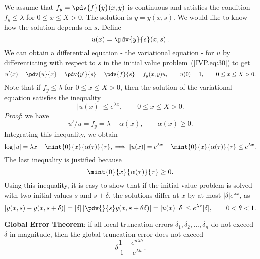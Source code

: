 We assume that $f_y=\pdv{f}{y}(x,y)$ is continuous
and satisfies the condition $f_y\le \lambda$ for $0\le x\le X>0$. The
solution is $y=y(x,s)$. We would like to know how the solution depends
on $s$. Define
% 
\begin{equation}
  u(x)=\pdv{y}{s}(x,s) \, .
 \label{IVP.eq:58}
\end{equation}
%
We can obtain a differential equation - the variational equation - for
$u$ by differentiating with respect to $s$ in the initial value
problem~(\ref{IVP.eq:30}) to get
%
\begin{equation}
  u'(x) = \pdv{u}{x} = \pdv{y'}{s} = \pdv{f}{s} = f_y(x,y) u, \qquad u(0)=1, \qquad 0 \le x \le X > 0. 
  \label{IVP.eq:31}
\end{equation}
% 
Note that if $f_y \le \lambda$ for $0 \le x \le X > 0$, then the solution
of the variational equation satisfies the inequality
%
\begin{equation}
  |u(x)| \le e^{\lambda x}, \qquad 0\le x\le X>0.
  \label{IVP.eq:33}
\end{equation}
%
{\it Proof}: we have 
%
\begin{equation}
  u' / u = f_y = \lambda-\alpha(x), \qquad \alpha(x)\ge 0.
  \label{IVP.eq:32}
\end{equation}
%
Integrating this inequality, we obtain
%
\begin{equation}
  \log|u| = \lambda x - \mint{0}{x}{\alpha(\tau)}{\tau}, \implies 
  |u(x)| = e^{\lambda x} - \mint{0}{x}{\alpha(\tau)}{\tau} \le e^{\lambda x}.
  \label{IVP.eq:34}
\end{equation}
%
The last inequality is justified because 
%
\begin{equation}
  \mint{0}{x}{\alpha(\tau)}{\tau} \ge 0.
  \label{IVP.eq:35}
\end{equation}
%
Using this inequality, it is easy to show that if the initial value
problem is solved with two initial values $s$ and $s+\delta $, the
solutions differ at $x$ by at most $|\delta|e^{\lambda x}$, as
%
\begin{equation}
  |y(x,s) - y(x,s+\delta )| = |\delta|
  \left | \pdv{}{s} y(x,s+\theta\delta) \right| =
  |u(x)| |\delta| \le e^{\lambda x}|\delta|, \qquad 0<\theta<1.
 \label{IVP.eq:36}
\end{equation}

\noindent \textbf{Global Error Theorem}: if all local truncation
errors $\delta_1,\delta_2,...,\delta_n$ do not exceed $\delta$ in
magnitude, then the global truncation error does not exceed
%
\begin{equation}
 \delta \frac{1-e^{n\lambda h}}{1-e^{\lambda h}}  .
 \label{IVP.eq:37}
\end{equation} 

